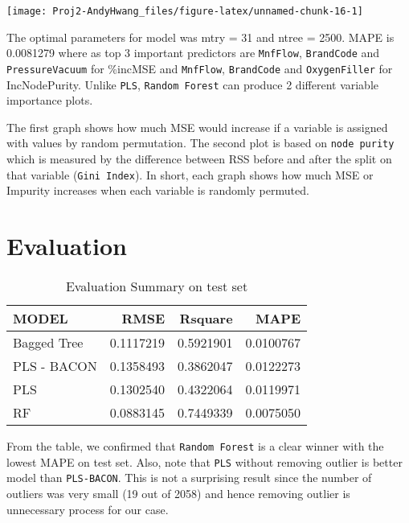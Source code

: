 \documentclass[]{report}
\begin{document}
\begin{center}\texttt{[image: Proj2-AndyHwang\_files/figure-latex/unnamed-chunk-16-1]} \end{center}

The optimal parameters for model was mtry = 31 and ntree = 2500. MAPE is
0.0081279 where as top 3 important predictors are \texttt{MnfFlow},
\texttt{BrandCode} and \texttt{PressureVacuum} for \%incMSE and
\texttt{MnfFlow}, \texttt{BrandCode} and \texttt{OxygenFiller} for
IncNodePurity. Unlike \texttt{PLS}, \texttt{Random\ Forest} can produce
2 different variable importance plots.

The first graph shows how much MSE would increase if a variable is
assigned with values by random permutation. The second plot is based on
\texttt{node\ purity} which is measured by the difference between RSS
before and after the split on that variable (\texttt{Gini\ Index}). In
short, each graph shows how much MSE or Impurity increases when each
variable is randomly permuted.

\chapter{Evaluation}\label{evaluation}

\begin{table}[H]

\caption{\label{tab:unnamed-chunk-17}Evaluation Summary on test set}
\centering
\fontsize{8}{10}\selectfont
\begin{tabular}[t]{lrrr}
\toprule
\textbf{MODEL} & \textbf{RMSE} & \textbf{Rsquare} & \textbf{MAPE}\\
\midrule
\rowcolor{gray!6}  Bagged Tree & 0.1117219 & 0.5921901 & 0.0100767\\
PLS - BACON & 0.1358493 & 0.3862047 & 0.0122273\\
\rowcolor{gray!6}  PLS & 0.1302540 & 0.4322064 & 0.0119971\\
RF & 0.0883145 & 0.7449339 & 0.0075050\\
\bottomrule
\end{tabular}
\end{table}

From the table, we confirmed that \texttt{Random\ Forest} is a clear
winner with the lowest MAPE on test set. Also, note that \texttt{PLS}
without removing outlier is better model than \texttt{PLS-BACON}. This
is not a surprising result since the number of outliers was very small
(19 out of 2058) and hence removing outlier is unnecessary process for
our case.
\end{document}
